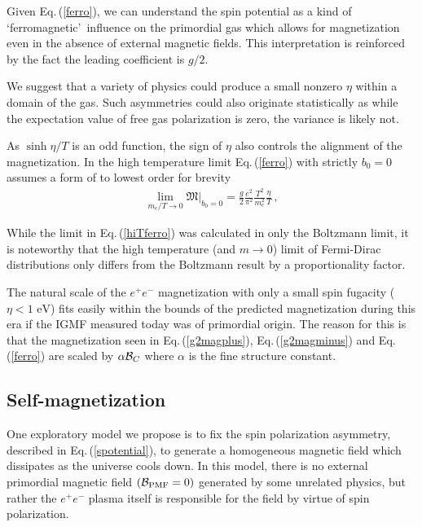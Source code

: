 \documentclass[aps,prd,floatfix,reprint]{revtex4-2}
\newcommand*{\eV}{\text{ eV}}
\newcommand{\req}[1]{Eq.\,(\ref{#1})}
\begin{document}
Given \req{ferro}, we can understand the spin potential as a kind of \lq ferromagnetic\rq\ influence on the primordial gas which allows for magnetization even in the absence of external magnetic fields. This interpretation is reinforced by the fact the leading coefficient is $g/2$.

We suggest that a variety of physics could produce a small nonzero $\eta$ within a domain of the gas. Such asymmetries could also originate statistically as while the expectation value of free gas polarization is zero, the variance is likely not.

As $\sinh{\eta/T}$ is an odd function, the sign of $\eta$ also controls the alignment of the magnetization. In the high temperature limit \req{ferro} with strictly $b_{0}=0$ assumes a form of to lowest order for brevity
\begin{align}
 \label{hiTferro}
 \lim_{m_{e}/T\rightarrow0}{\mathfrak M}\vert_{b_{0}=0}=\frac{g}{2}\frac{e^{2}}{\pi^{2}}\frac{T^{2}}{m_{e}^{2}}\frac{\eta}{T}\,,
\end{align}

While the limit in \req{hiTferro} was calculated in only the Boltzmann limit, it is noteworthy that the high temperature (and $m\rightarrow0$) limit of Fermi-Dirac distributions only differs from the Boltzmann result by a proportionality factor. 

The natural scale of the $e^{+}e^{-}$ magnetization with only a small spin fugacity ($\eta<1\eV$) fits easily within the bounds of the predicted magnetization during this era if the IGMF measured today was of primordial origin. The reason for this is that the magnetization seen in \req{g2magplus}, \req{g2magminus} and \req{ferro} are scaled by $\alpha{\cal B}_{C}$ where $\alpha$ is the fine structure constant.

\subsection{Self-magnetization}
\label{sec:self}

\noindent One exploratory model we propose is to fix the spin polarization asymmetry, described in \req{spotential}, to generate a homogeneous magnetic field which dissipates as the universe cools down. In this model, there is no external primordial magnetic field $({\cal B}_{\rm PMF}=0)$ generated by some unrelated physics, but rather the $e^{+}e^{-}$ plasma itself is responsible for the field by virtue of spin polarization.
\end{document}
